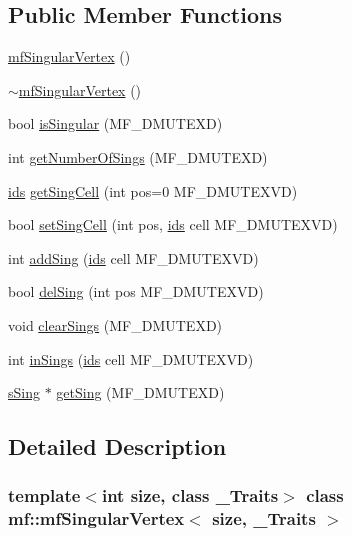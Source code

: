 \subsection*{Public Member Functions}
\begin{DoxyCompactItemize}
\item 
\hyperlink{classmf_1_1mfSingularVertex_a44c61e349c686e1ffeaec3f6bbe5010c}{mfSingularVertex} ()
\item 
\hyperlink{classmf_1_1mfSingularVertex_a8f9efd5ee656e83a0f50c9833fc2af9f}{$\sim$mfSingularVertex} ()
\item 
bool \hyperlink{classmf_1_1mfSingularVertex_a2a85f3a4a1b98b63ca9504ef1ad4da7e}{isSingular} (MF\_\-DMUTEXD)
\item 
int \hyperlink{classmf_1_1mfSingularVertex_a5256ee7412e6d5173390fc7409d74fc5}{getNumberOfSings} (MF\_\-DMUTEXD)
\item 
\hyperlink{classmf_1_1mfBase_a3b23f16ddf59da0a91ab12cf57c1f111}{ids} \hyperlink{classmf_1_1mfSingularVertex_a3614e72d2adb6efef5345ef0edf30c47}{getSingCell} (int pos=0 MF\_\-DMUTEXVD)
\item 
bool \hyperlink{classmf_1_1mfSingularVertex_a943c961054aaf8e3512254ea8312640a}{setSingCell} (int pos, \hyperlink{classmf_1_1mfBase_a3b23f16ddf59da0a91ab12cf57c1f111}{ids} cell MF\_\-DMUTEXVD)
\item 
int \hyperlink{classmf_1_1mfSingularVertex_a8100c3e3601205ca8996057cc0732b1a}{addSing} (\hyperlink{classmf_1_1mfBase_a3b23f16ddf59da0a91ab12cf57c1f111}{ids} cell MF\_\-DMUTEXVD)
\item 
bool \hyperlink{classmf_1_1mfSingularVertex_a2e7093fbc051f93cf99c092ff8dcfa70}{delSing} (int pos MF\_\-DMUTEXVD)
\item 
void \hyperlink{classmf_1_1mfSingularVertex_a86f55d574e4415c530d7945018802da3}{clearSings} (MF\_\-DMUTEXD)
\item 
int \hyperlink{classmf_1_1mfSingularVertex_a834794974d9a2a6315830da23abf3378}{inSings} (\hyperlink{classmf_1_1mfBase_a3b23f16ddf59da0a91ab12cf57c1f111}{ids} cell MF\_\-DMUTEXVD)
\item 
\hyperlink{classmf_1_1mfSing}{sSing} $\ast$ \hyperlink{classmf_1_1mfSingularVertex_adc2be2ffb1b40b539ce0bbff34aa1a99}{getSing} (MF\_\-DMUTEXD)
\end{DoxyCompactItemize}


\subsection{Detailed Description}
\subsubsection*{template$<$int size, class \_\-Traits$>$ class mf::mfSingularVertex$<$ size, \_\-Traits $>$}


